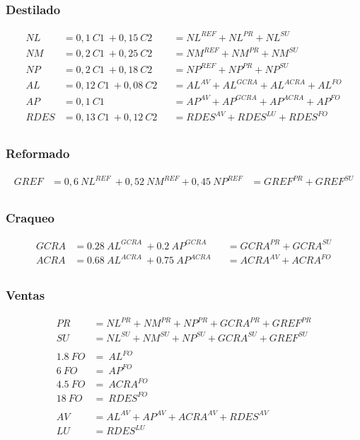 \documentclass[a4paper,10pt]{article}
\begin{document}
\subsubsection{Destilado}

\begin{align*}
 NL &=   0,1 \ C1 \  + 0,15 \ C2   &   &= NL^{REF} + NL^{PR} + NL^{SU} \\
 NM &=   0,2 \ C1 \  + 0,25 \ C2   &   &= NM^{REF} + NM^{PR} + NM^{SU} \\
 NP &=   0,2 \ C1 \  + 0,18 \ C2   &   &= NP^{REF} + NP^{PR} + NP^{SU} \\
 AL &=   0,12 \ C1 \  + 0,08 \ C2  &   &= AL^{AV} + AL^{GCRA} + AL^{ACRA} + AL^{FO}\\
 AP &=   0,1 \ C1 \		    &   &= AP^{AV} + AP^{GCRA} + AP^{ACRA} + AP^{FO} \\
 RDES &= 0,13 \ C1 \  + 0,12 \ C2  &   &= RDES^{AV} + RDES^{LU} + RDES^{FO}\\ 
\end{align*}

\subsubsection{Reformado}

\begin{align*}
 GREF &=  0,6 \ NL^{REF} \  + 0,52 \ NM^{REF} + 0,45 \ NP^{REF} &= GREF^{PR} + GREF^{SU} \\
\end{align*}

\subsubsection{Craqueo}

\begin{align*}
 GCRA &=  0.28 \ AL^{GCRA} \  + 0.2 \ AP^{GCRA}  & &= GCRA^{PR} + GCRA^{SU}\\
 ACRA &=  0.68 \ AL^{ACRA} \  + 0.75 \ AP^{ACRA} & &= ACRA^{AV} + ACRA^{FO} \\
 \end{align*}

\subsubsection{Ventas}
 
\begin{align*}
 PR &=  NL^{PR} + NM^{PR} + NP^{PR}+ GCRA^{PR} + GREF^{PR} \\
 SU &=  NL^{SU} + NM^{SU} + NP^{SU}+ GCRA^{SU} + GREF^{SU} \\
 \\
 1.8\ 	FO	&= \ AL^{FO}  \\
 6\ 	FO	&= \ AP^{FO}   \\
 4.5\ 	FO	&= \ ACRA^{FO} \\
 18\ 	FO 	&= \ RDES^{FO} \\
 \\
 AV &=  AL^{AV} + AP^{AV} + ACRA^{AV} + RDES^{AV} \\
 LU &=  RDES^{LU} 
 \end{align*}
\end{document}
